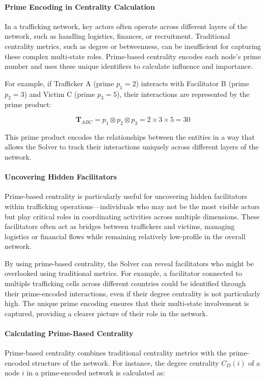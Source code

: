 \documentclass[%
 preprint, linenumbers,
 amsmath,amssymb,
 aps, physrev,
]{revtex4-2}
\begin{document}
\paragraph{Prime Encoding in Centrality Calculation}
In a trafficking network, key actors often operate across different layers of the network, such as handling logistics, finances, or recruitment. Traditional centrality metrics, such as degree or betweenness, can be insufficient for capturing these complex multi-state roles. Prime-based centrality encodes each node’s prime number and uses these unique identifiers to calculate influence and importance.

For example, if Trafficker A (prime \(p_1 = 2\)) interacts with Facilitator B (prime \(p_2 = 3\)) and Victim C (prime \(p_3 = 5\)), their interactions are represented by the prime product:

\[
\mathbf{T}_{ABC} = p_1 \otimes p_2 \otimes p_3 = 2 \times 3 \times 5 = 30
\]

This prime product encodes the relationships between the entities in a way that allows the Solver to track their interactions uniquely across different layers of the network.

\paragraph{Uncovering Hidden Facilitators}
Prime-based centrality is particularly useful for uncovering hidden facilitators within trafficking operations—individuals who may not be the most visible actors but play critical roles in coordinating activities across multiple dimensions. These facilitators often act as bridges between traffickers and victims, managing logistics or financial flows while remaining relatively low-profile in the overall network.

By using prime-based centrality, the Solver can reveal facilitators who might be overlooked using traditional metrics. For example, a facilitator connected to multiple trafficking cells across different countries could be identified through their prime-encoded interactions, even if their degree centrality is not particularly high. The unique prime encoding ensures that their multi-state involvement is captured, providing a clearer picture of their role in the network.

\paragraph{Calculating Prime-Based Centrality}
Prime-based centrality combines traditional centrality metrics with the prime-encoded structure of the network. For instance, the degree centrality \(C_D(i)\) of a node \(i\) in a prime-encoded network is calculated as:
\end{document}
